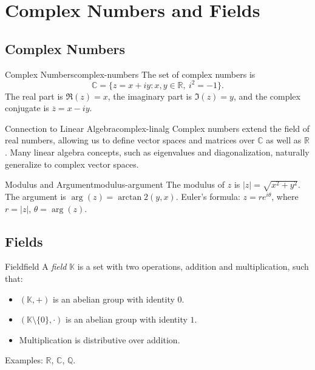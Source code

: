 \section{Complex Numbers and Fields}
\label{sec:complex-fields}

\subsection{Complex Numbers}

\begin{definition}{Complex Numbers}{complex-numbers}
    The set of complex numbers is
    \[
        \mathbb{C} = \{ z = x + iy : x, y \in \mathbb{R},\ i^2 = -1 \}.
    \]
    The real part is \(\Re(z) = x\), the imaginary part is \(\Im(z) = y\), and the complex conjugate is \(\overline{z} = x - iy\).
\end{definition}

\begin{remark}{Connection to Linear Algebra}{complex-linalg}
    Complex numbers extend the field of real numbers, allowing us to define vector spaces and matrices over \(\mathbb{C}\) as well as \(\mathbb{R}\). Many linear algebra concepts, such as eigenvalues and diagonalization, naturally generalize to complex vector spaces.
\end{remark}

\begin{property}{Modulus and Argument}{modulus-argument}
    The modulus of \(z\) is \(|z| = \sqrt{x^2 + y^2}\). The argument is \(\arg(z) = \arctan2(y, x)\).
    Euler's formula: \(z = r e^{i\theta}\), where \(r = |z|\), \(\theta = \arg(z)\).
\end{property}

\subsection{Fields}

\begin{definition}{Field}{field}
    A \emph{field} \(\mathbb{K}\) is a set with two operations, addition and multiplication, such that:
    \begin{itemize}[nosep]
        \item \((\mathbb{K}, +)\) is an abelian group with identity \(0\).
        \item \((\mathbb{K} \setminus \{0\}, \cdot)\) is an abelian group with identity \(1\).
        \item Multiplication is distributive over addition.
    \end{itemize}
    Examples: \(\mathbb{R}\), \(\mathbb{C}\), \(\mathbb{Q}\).
\end{definition}

